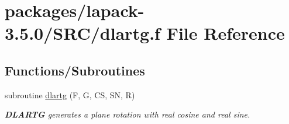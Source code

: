 \hypertarget{dlartg_8f}{}\section{packages/lapack-\/3.5.0/\+S\+R\+C/dlartg.f File Reference}
\label{dlartg_8f}
\subsection*{Functions/\+Subroutines}
\begin{DoxyCompactItemize}
\item 
subroutine \hyperlink{group__auxOTHERauxiliary_ga73cdfda601476bb0fdd86047dee1d357}{dlartg} (F, G, C\+S, S\+N, R)
\begin{DoxyCompactList}\small\item\em {\bfseries D\+L\+A\+R\+T\+G} generates a plane rotation with real cosine and real sine. \end{DoxyCompactList}\end{DoxyCompactItemize}
